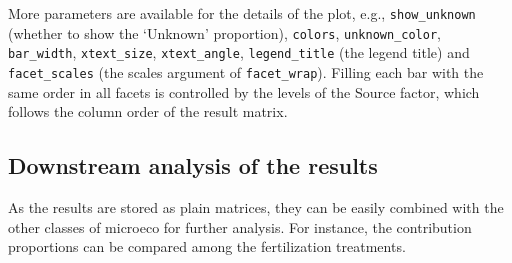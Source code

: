 \documentclass[
]{book}
\newenvironment{Shaded}{\begin{snugshade}}{\end{snugshade}}
\newcommand{\AttributeTok}[1]{\textcolor[rgb]{0.13,0.29,0.53}{#1}}
\newcommand{\CommentTok}[1]{\textcolor[rgb]{0.56,0.35,0.01}{\textit{#1}}}
\newcommand{\ConstantTok}[1]{\textcolor[rgb]{0.56,0.35,0.01}{#1}}
\newcommand{\DecValTok}[1]{\textcolor[rgb]{0.00,0.00,0.81}{#1}}
\newcommand{\FunctionTok}[1]{\textcolor[rgb]{0.13,0.29,0.53}{\textbf{#1}}}
\newcommand{\NormalTok}[1]{#1}
\newcommand{\SpecialCharTok}[1]{\textcolor[rgb]{0.81,0.36,0.00}{\textbf{#1}}}
\newcommand{\StringTok}[1]{\textcolor[rgb]{0.31,0.60,0.02}{#1}}
\begin{document}
More parameters are available for the details of the plot, e.g., \texttt{show\_unknown} (whether to show the `Unknown' proportion),
\texttt{colors}, \texttt{unknown\_color}, \texttt{bar\_width}, \texttt{xtext\_size}, \texttt{xtext\_angle},
\texttt{legend\_title} (the legend title) and \texttt{facet\_scales} (the scales argument of \texttt{facet\_wrap}).
Filling each bar with the same order in all facets is controlled by the levels of the Source factor,
which follows the column order of the result matrix.

\begin{Shaded}
\end{Shaded}

\subsection{Downstream analysis of the results}\label{downstream-analysis-of-the-results}

As the results are stored as plain matrices, they can be easily combined with the other classes of microeco
for further analysis. For instance, the contribution proportions can be compared among the fertilization treatments.
\end{document}
